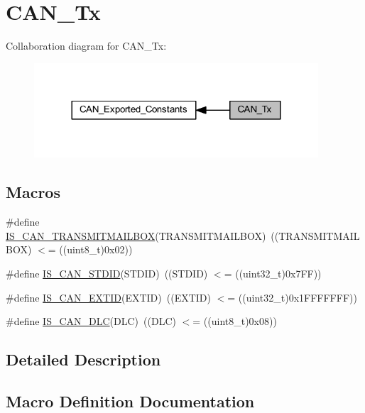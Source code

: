 \hypertarget{group___c_a_n___tx}{}\section{C\+A\+N\+\_\+\+Tx}
\label{group___c_a_n___tx}
Collaboration diagram for C\+A\+N\+\_\+\+Tx\+:
\nopagebreak
\begin{figure}[H]
\begin{center}
\leavevmode
\includegraphics[width=300pt]{group___c_a_n___tx}
\end{center}
\end{figure}
\subsection*{Macros}
\begin{DoxyCompactItemize}
\item 
\#define \hyperlink{group___c_a_n___tx_ga218b3e1380c4d49163c91a1af904e44c}{I\+S\+\_\+\+C\+A\+N\+\_\+\+T\+R\+A\+N\+S\+M\+I\+T\+M\+A\+I\+L\+B\+OX}(T\+R\+A\+N\+S\+M\+I\+T\+M\+A\+I\+L\+B\+OX)~((T\+R\+A\+N\+S\+M\+I\+T\+M\+A\+I\+L\+B\+OX) $<$= ((uint8\+\_\+t)0x02))
\item 
\#define \hyperlink{group___c_a_n___tx_gaf059e4383fa69dec6e18216b22a87f51}{I\+S\+\_\+\+C\+A\+N\+\_\+\+S\+T\+D\+ID}(S\+T\+D\+ID)~((S\+T\+D\+ID) $<$= ((uint32\+\_\+t)0x7\+F\+F))
\item 
\#define \hyperlink{group___c_a_n___tx_ga62dbc2163ad6751b3f921e717b00e9f2}{I\+S\+\_\+\+C\+A\+N\+\_\+\+E\+X\+T\+ID}(E\+X\+T\+ID)~((E\+X\+T\+ID) $<$= ((uint32\+\_\+t)0x1\+F\+F\+F\+F\+F\+F\+F))
\item 
\#define \hyperlink{group___c_a_n___tx_ga6109469a6a2792b3e7c6be520ea50d36}{I\+S\+\_\+\+C\+A\+N\+\_\+\+D\+LC}(D\+LC)~((D\+LC) $<$= ((uint8\+\_\+t)0x08))
\end{DoxyCompactItemize}


\subsection{Detailed Description}


\subsection{Macro Definition Documentation}
\mbox{\label{group___c_a_n___tx_ga6109469a6a2792b3e7c6be520ea50d36}} 
